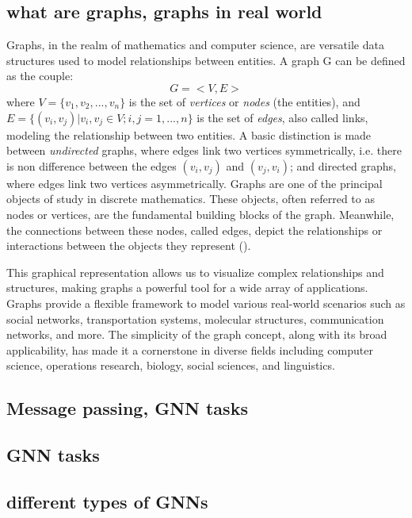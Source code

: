 \documentclass[binding=0.6cm,LaM]{sapthesis}
\newcommand{\mycite}[1]{(\cite{#1})}
\begin{document}
\subsection{what are graphs, graphs in real world}
Graphs, in the realm of mathematics and computer science, are versatile data structures used to model relationships between entities. A graph G can be defined as the couple:
\begin{equation}
    G = <V,E>
\end{equation}
where $V = \{v_1,v_2,...,v_n\}$ is the set of \textit{vertices} or \textit{nodes} (the entities), and $E = \{(v_i,v_j) | v_i,v_j \in V; i,j = 1,...,n\}$ is the set of \textit{edges}, also called links, modeling the relationship between two entities.
A basic distinction is made between \textit{undirected} graphs, where edges link two vertices symmetrically, i.e. there is non difference between the edges $(v_i,v_j)$ and $(v_j,v_i)$; and directed graphs, where edges link two vertices asymmetrically. Graphs are one of the principal objects of study in discrete mathematics. 
These objects, often referred to as nodes or vertices, are the fundamental building blocks of the graph. Meanwhile, the connections between these nodes, called edges, depict the relationships or interactions between the objects they represent \mycite{cormen2022introduction}.

This graphical representation allows us to visualize complex relationships and structures, making graphs a powerful tool for a wide array of applications. Graphs provide a flexible framework to model various real-world scenarios such as social networks, transportation systems, molecular structures, communication networks, and more. The simplicity of the graph concept, along with its broad applicability, has made it a cornerstone in diverse fields including computer science, operations research, biology, social sciences, and linguistics.

\subsection{Message passing, GNN tasks}
\subsection{GNN tasks}
\subsection{different types of GNNs}
\end{document}
